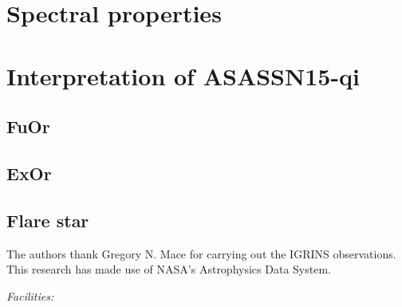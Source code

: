 \documentclass[iop,revtex4]{emulateapj}%
\newcommand{\name}{ASASSN15-qi}
\begin{document}
\section{Spectral properties}\label{sec:lines}
\section{Interpretation of \name}\label{sec:interp} 
\subsection{FuOr}
\subsection{ExOr}
\subsection{Flare star}

\acknowledgements
The authors thank Gregory N. Mace for carrying out the IGRINS observations. This research has made use of NASA's Astrophysics Data System.

{\it Facilities:} 

\clearpage



\end{document}

